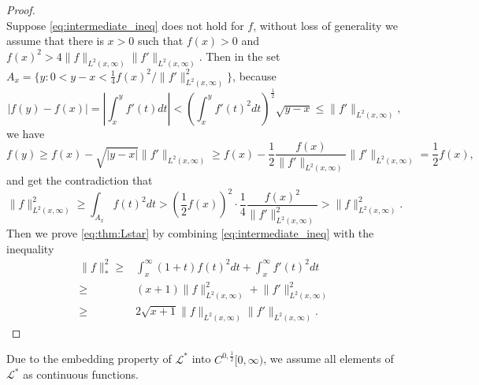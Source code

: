 \documentclass[11pt, a4paper]{article}
\numberwithin{equation}{section}
\newcommand{\Lstar}{\mathcal{L}^*}
\theoremstyle{definition}
\theoremstyle{remark}
\begin{document}
\begin{proof}
\begin{equation}
  \end{equation}
  Suppose \eqref{eq:intermediate_ineq} does not hold for $f$, without loss of generality we assume that there is $x > 0$ such that $f(x) > 0$ and $f(x)^2 > 4\lVert f \rVert_{L^2(x, \infty)} \lVert f' \rVert_{L^2(x, \infty)}$. Then in the set $A_x = \{ y: 0 < y - x < \frac{1}{4} f(x)^2 / \lVert f' \rVert^2_{L^2(x, \infty)} \}$, because
  \begin{equation}
    \lvert f(y) - f(x) \rvert = \left\lvert \int^y_x f'(t) dt \right\rvert < \left( \int^y_x f'(t)^2 dt \right)^{\frac{1}{2}} \sqrt{y-x} \leq \lVert f' \rVert_{L^2(x, \infty)},
  \end{equation}
  we have
  \begin{equation}
    f(y) \geq f(x) - \sqrt{\lvert y - x \rvert} \lVert f' \rVert_{L^2(x, \infty)} \geq f(x) - \frac{1}{2} \frac{f(x)}{\lVert f' \rVert_{L^2(x, \infty)}} \lVert f' \rVert_{L^2(x, \infty)} = \frac{1}{2} f(x),
  \end{equation}
  and get the contradiction that
  \begin{equation}
    \lVert f \rVert^2_{L^2(x, \infty)} \geq \int_{A_x} f(t)^2 dt > \left( \frac{1}{2} f(x) \right)^2 \cdot \frac{1}{4} \frac{f(x)^2}{\lVert f' \rVert^2_{L^2(x, \infty)}} > \lVert f \rVert^2_{L^2(x, \infty)}.
  \end{equation}
  Then we prove \eqref{eq:thm:Lstar} by combining \eqref{eq:intermediate_ineq} with the inequality
  \begin{equation}
    \begin{split}
      \lVert f \rVert^2_* \geq {}& \int^{\infty}_x (1 + t) f(t)^2 dt + \int^{\infty}_x f'(t)^2 dt \\
      \geq {}& (x + 1) \lVert f \rVert^2_{L^2(x, \infty)} + \lVert f' \rVert^2_{L^2(x, \infty)} \\
      \geq {}& 2\sqrt{x + 1} \lVert f \rVert_{L^2(x, \infty)} \lVert f' \rVert_{L^2(x, \infty)}.
    \end{split}
  \end{equation}
\end{proof}
Due to the embedding property of $\Lstar$ into $C^{0, \frac{1}{2}}[0, \infty)$, we assume all elements of $\Lstar$ as continuous functions.
\end{document}
